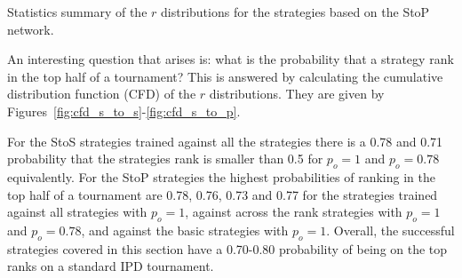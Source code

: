 \begin{table}[!htbp]
    \begin{center}
    \resizebox{.9\textwidth}{!}{
        
    }
\end{center}
\caption{Statistics summary of the \(r\) distributions for the strategies
based on the StoP network.}\label{table:statistic_summary_s_to_p}
\end{table}

An interesting question that arises is: what is the probability that a strategy
rank in the top half of a tournament? This is answered by calculating the
cumulative distribution function (CFD) of the \(r\) distributions.
They are given by Figures~\ref{fig:cfd_s_to_s}-\ref{fig:cfd_s_to_p}.

For the StoS strategies trained against all the strategies there is a 0.78
and 0.71 probability that the strategies rank is smaller than 0.5 for \(p_o=1\)
and \(p_o=0.78\) equivalently. For the StoP strategies the highest probabilities
of ranking in the top half of a tournament are 0.78, 0.76, 0.73 and 0.77 for
the strategies trained against all strategies with \(p_o=1\), against
across the rank strategies with \(p_o=1\) and \(p_o=0.78\), and against the
basic strategies with \(p_o=1\). Overall, the successful strategies covered
in this section have a 0.70-0.80 probability of being on the top ranks on a
standard IPD tournament.

